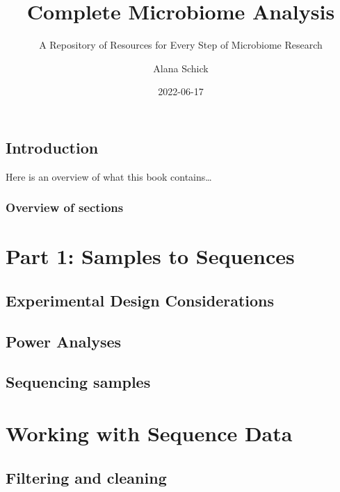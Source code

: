 \documentclass[
]{book}
\title{Complete Microbiome Analysis}
\subtitle{A Repository of Resources for Every Step of Microbiome Research}
\author{Alana Schick}
\date{2022-06-17}
\begin{document}
\maketitle

{
\setcounter{tocdepth}{1}
\tableofcontents
}
\hypertarget{introduction}{%
\chapter*{Introduction}\label{introduction}}

Here is an overview of what this book contains\ldots{}

\hypertarget{overview-of-sections}{%
\section*{Overview of sections}\label{overview-of-sections}}

\hypertarget{part-part-1-samples-to-sequences}{%
\part{Part 1: Samples to Sequences}\label{part-part-1-samples-to-sequences}}

\hypertarget{dna-extract}{%
\chapter{Experimental Design Considerations}\label{dna-extract}}

\hypertarget{power-analyses}{%
\chapter{Power Analyses}\label{power-analyses}}

\hypertarget{sequencing-samples}{%
\chapter{Sequencing samples}\label{sequencing-samples}}

\hypertarget{part-working-with-sequence-data}{%
\part{Working with Sequence Data}\label{part-working-with-sequence-data}}

\hypertarget{filtering-and-cleaning}{%
\chapter{Filtering and cleaning}\label{filtering-and-cleaning}}
\end{document}
